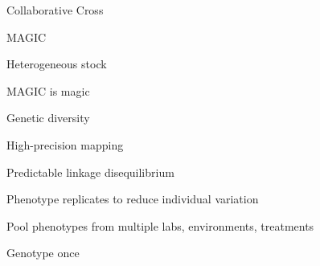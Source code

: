 \documentclass[12pt,t,aspectratio=169]{beamer}
\begin{document}
\begin{frame}[c]{Collaborative Cross}


\end{frame}


\begin{frame}[c]{MAGIC}


\end{frame}



\begin{frame}[c]{Heterogeneous stock}

  \vspace{2mm}


\end{frame}


\begin{frame}[c]{MAGIC is magic}

\bbi
\item Genetic diversity

\item High-precision mapping

\item Predictable linkage disequilibrium

\item Phenotype replicates to reduce individual variation

\item Pool phenotypes from multiple labs, environments, treatments

\item Genotype once


\ei

\end{frame}
\end{document}
